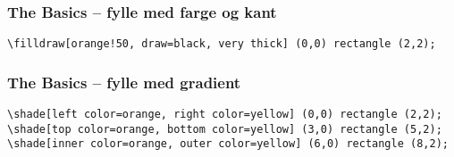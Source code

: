 \documentclass{beamer}
\begin{document}
\begin{frame}[fragile]
\frametitle{The Basics -- fylle med farge og kant}
\begin{center}
\end{center}


\vspace{20pt}

\begin{Verbatim}[fontsize=\footnotesize]
\filldraw[orange!50, draw=black, very thick] (0,0) rectangle (2,2);
\end{Verbatim}

\end{frame}

\begin{frame}[fragile]
\frametitle{The Basics -- fylle med gradient}
\begin{center}
\end{center}

\vspace{20pt}

\begin{Verbatim}[fontsize=\footnotesize]
\shade[left color=orange, right color=yellow] (0,0) rectangle (2,2);
\shade[top color=orange, bottom color=yellow] (3,0) rectangle (5,2);
\shade[inner color=orange, outer color=yellow] (6,0) rectangle (8,2);
\end{Verbatim}

\end{frame}
\end{document}
